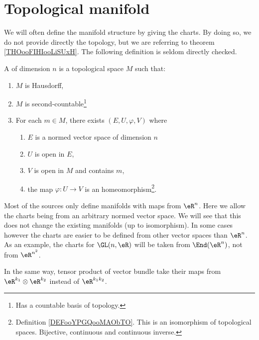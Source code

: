 

\section{Topological manifold}

We will often define the manifold structure by giving the charts. By doing so, we do not provide directly the topology, but we are referring to theorem \ref{THOooFIHIooLiSUxH}. The following definition is seldom directly checked.
\begin{definition}				\label{DEFooJOMAooZscKwn}
	A  of dimension \( n\) is a topological space \( M\) such that:
	\begin{enumerate}
		\item		\label{ITEMooZZXHooPICcjz}
		      \( M\) is Hausdorff,
		\item		\label{ITEMooKOSMooSawqbB}
		      \( M\) is second-countable\footnote{Has a countable basis of topology.}
		\item		\label{ITEMooJOPDooPiOadZ}
		      For each \( m\in M\), there exists \( (E,U,\varphi,V)\) where
		      \begin{enumerate}
			      \item
			            \( E\) is a normed vector space of dimension \( n\)
			      \item
			            \( U\) is open in \( E\),
			      \item
			            \( V\) is open in \( M\) and contains \( m\),
			      \item
			            the map \(\varphi \colon U\to V  \) is an homeomorphism\footnote{Definition \ref{DEFooYPGQooMAObTO}. This is an isomorphism of topological spaces. Bijective, continuous and continuous inverse.}.
		      \end{enumerate}
	\end{enumerate}
\end{definition}

\begin{normaltext}
	Most of the sources only define manifolds with maps from \( \eR^n\). Here we allow the charts being from an arbitrary normed vector space. We will see that this does not change the existing manifolds (up to isomorphism). In some cases however the charts are easier to be defined from other vector spaces than \( \eR^n\). As an example, the charts for \( \GL(n,\eR)\) will be taken from \( \End(\eR^n)\), not from \( \eR^{n^2}\).

	In the same way, tensor product of vector bundle take their maps from \( \eR^{k_1}\otimes \eR^{k_2}\) instead of \( \eR^{k_1k_2}\).
\end{normaltext}

